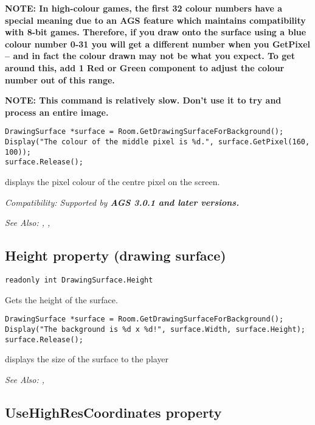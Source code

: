 \bf{NOTE:} In high-colour games, the first 32 colour numbers have a special meaning
due to an AGS feature which maintains compatibility with 8-bit games. Therefore, if
you draw onto the surface using a blue colour number 0-31 you will get a different number
when you GetPixel -- and in fact the colour drawn may not be what you expect.
To get around this, add 1 Red or Green component to adjust the colour number out of this range.

\bf{NOTE:} This command is relatively slow. Don't use it to try and process an entire image.

\begin{verbatim}
DrawingSurface *surface = Room.GetDrawingSurfaceForBackground();
Display("The colour of the middle pixel is %d.", surface.GetPixel(160, 100));
surface.Release();
\end{verbatim}
displays the pixel colour of the centre pixel on the screen.

\it{Compatibility:} Supported by \bf{AGS 3.0.1} and later versions.

\it{See Also:} ,
,


\subsection{Height property (drawing surface)}\label{DrawingSurface.Height}%

\begin{verbatim}
readonly int DrawingSurface.Height
\end{verbatim}
Gets the height of the surface.

\begin{verbatim}
DrawingSurface *surface = Room.GetDrawingSurfaceForBackground();
Display("The background is %d x %d!", surface.Width, surface.Height);
surface.Release();
\end{verbatim}
displays the size of the surface to the player

\it{See Also:} ,


\subsection{UseHighResCoordinates property}\label{DrawingSurface.UseHighResCoordinates}%

